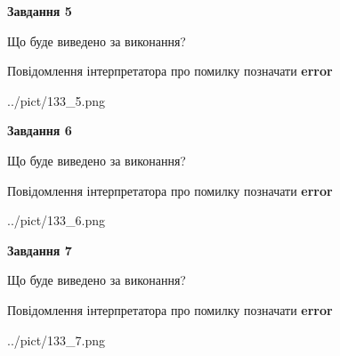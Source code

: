 \documentclass[10pt, ukrainian]{article}
\begin{document}
{\begin {large}
{\begin {center}\textbf{Завдання 5}\end {center}}\par
Що буде виведено за виконання? \par
Повідомлення інтерпретатора про помилку позначати \textbf{error}

\begin{center}
	{../pict/133_5.png}
\end{center}
\newpage

{\begin {center}\textbf{Завдання 6}\end {center}}\par
Що буде виведено за виконання? \par
Повідомлення інтерпретатора про помилку позначати \textbf{error}

\begin{center}
	{../pict/133_6.png}
\end{center}
\newpage

{\begin {center}\textbf{Завдання 7}\end {center}}\par
Що буде виведено за виконання? \par
Повідомлення інтерпретатора про помилку позначати \textbf{error}

\begin{center}
	{../pict/133_7.png}
\end{center}
\newpage

\end {large}}
\end{document}
